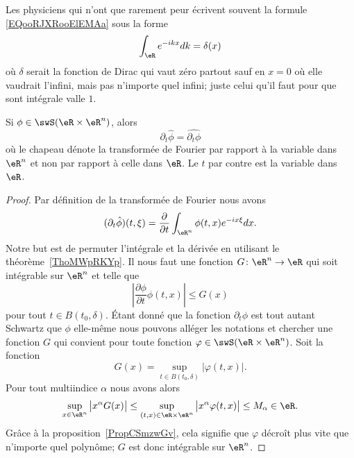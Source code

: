 \begin{normaltext}
    Les physiciens qui n'ont que rarement peur écrivent souvent la formule \eqref{EQooRJXRooElEMAa} sous la forme
    \begin{equation}
        \int_{\eR} e^{-ikx}dk=\delta(x)
    \end{equation}
    où \( \delta\) serait la fonction de Dirac qui vaut zéro partout sauf en \( x=0\) où elle vaudrait l'infini, mais pas n'importe quel infini; juste celui qu'il faut pour que sont intégrale valle \( 1\).
\end{normaltext}

\begin{lemma}   \label{LemYYjFZSa}
    Si \( \phi\in\swS(\eR\times \eR^n)\), alors
    \begin{equation}
        \partial_t\hat\phi=\widehat{\partial_t\phi}
    \end{equation}
    où le chapeau dénote la transformée de Fourier par rapport à la variable dans \( \eR^n\) et non par rapport à celle dans \( \eR\). Le \( t\) par contre est la variable dans \( \eR\).
\end{lemma}

\begin{proof}
    Par définition de la transformée de Fourier nous avons
    \begin{equation}
        (\partial_t\hat\phi)(t,\xi)=\frac{ \partial  }{ \partial t }\int_{\eR^n}\phi(t,x) e^{-i x\xi}dx.
    \end{equation}
    Notre but est de permuter l'intégrale et la dérivée en utilisant le théorème~\ref{ThoMWpRKYp}. Il nous faut une fonction \( G\colon \eR^n\to \eR\) qui soit intégrable sur \( \eR^n\) et telle que
    \begin{equation}
        \left| \frac{ \partial \phi }{ \partial t }\phi(t,x) \right| \leq G(x)
    \end{equation}
    pour tout \( t\in B(t_0,\delta)\). Étant donné que la fonction \( \partial_t\phi\) est tout autant Schwartz que \( \phi\) elle-même nous pouvons alléger les notations et chercher une fonction \( G\) qui convient pour toute fonction \( \varphi\in\swS(\eR\times \eR^n)\). Soit la fonction
    \begin{equation}
        G(x)=\sup_{t\in B(t_0,\delta)}| \varphi(t,x) |.
    \end{equation}
    Pour tout multiindice \( \alpha\) nous avons alors
    \begin{equation}
        \sup_{x\in \eR^n}\big| x^{\alpha}G(x) \big|\leq \sup_{(t,x)\in \eR\times \eR^n}\big| x^{\alpha}\varphi(t,x) \big|\leq M_{\alpha}\in \eR.
    \end{equation}
    Grâce à la proposition~\ref{PropCSmzwGv}, cela signifie que \( \varphi\) décroît plus vite que n'importe quel polynôme; \( G\) est donc intégrable sur \( \eR^n\).
\end{proof}

